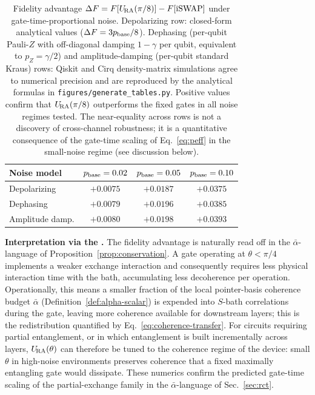 \begin{table}[htbp]
\centering
\caption{Fidelity advantage $\Delta F = F[U_{\!\mathrm{RA}}(\pi/8)] - F[\mathrm{iSWAP}]$
under gate-time-proportional noise. Depolarizing row: closed-form
analytical values ($\Delta F = 3 p_{\rm base}/8$). Dephasing
(per-qubit Pauli-$Z$ with off-diagonal damping $1{-}\gamma$ per qubit,
equivalent to $p_Z = \gamma/2$) and amplitude-damping (per-qubit
standard Kraus) rows: Qiskit and Cirq density-matrix simulations agree
to numerical precision and are reproduced by the analytical formulas
in \texttt{figures/\allowbreak generate\_\allowbreak tables.py}. Positive values confirm that
$U_{\!\mathrm{RA}}(\pi/8)$ outperforms the fixed gates in all noise regimes tested.
The near-equality across rows is not a discovery of cross-channel
robustness; it is a quantitative consequence of the gate-time scaling
of Eq.~\eqref{eq:peff} in the small-noise regime (see discussion
below).}
\label{tab:fidelity-all}
\begin{tabular}{lccc}
\toprule
Noise model & $p_{\rm base} = 0.02$ & $p_{\rm base} = 0.05$ & $p_{\rm base} = 0.10$ \\
\midrule
Depolarizing    & $+0.0075$ & $+0.0187$ & $+0.0375$ \\
Dephasing       & $+0.0079$ & $+0.0196$ & $+0.0385$ \\
Amplitude damp. & $+0.0080$ & $+0.0198$ & $+0.0393$ \\
\bottomrule
\end{tabular}
\end{table}

\textbf{Interpretation via the \RCF.}
The fidelity advantage is naturally read off in the
$\bar\alpha$-language of Proposition~\ref{prop:conservation}.
A gate operating at $\theta < \pi/4$ implements a weaker exchange
interaction and consequently requires less physical interaction time
with the bath, accumulating less decoherence per operation.
Operationally, this means a smaller fraction of the local pointer-basis
coherence budget $\bar\alpha$ (Definition~\ref{def:alpha-scalar}) is
expended into $S$-bath correlations during the gate, leaving more
coherence available for downstream layers; this is the redistribution quantified by Eq.~\eqref{eq:coherence-transfer}.
For circuits requiring partial entanglement, or in which entanglement
is built incrementally across layers, $U_{\!\mathrm{RA}}(\theta)$ can therefore be
tuned to the coherence regime of the device: small $\theta$ in
high-noise environments preserves coherence that a fixed maximally
entangling gate would dissipate.
These numerics confirm the predicted gate-time scaling of the
partial-exchange family in the $\bar\alpha$-language of
Sec.~\ref{sec:rct}.

